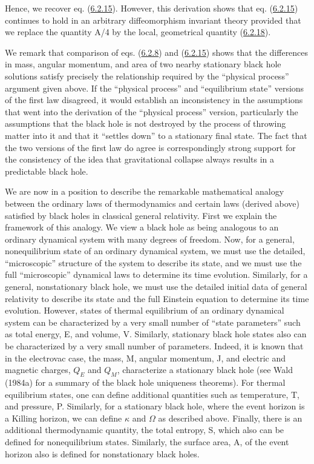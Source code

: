 \documentclass[11pt,a4paper]{article}
\begin{document}
\hypertarget{source-160}{}

Hence, we recover eq. (\hyperref[eq:6.2.15]{6.2.15}). However, this derivation shows that eq. (\hyperref[eq:6.2.15]{6.2.15}) continues to hold in an arbitrary diffeomorphism invariant theory provided that we replace the quantity A/4 by the local, geometrical quantity (\hyperref[eq:6.2.18]{6.2.18}).

We remark that comparison of eqs. (\hyperref[eq:6.2.8]{6.2.8}) and (\hyperref[eq:6.2.15]{6.2.15}) shows that the differences in mass, angular momentum, and area of two nearby stationary black hole solutions satisfy precisely the relationship required by the ``physical process'' argument given above. If the ``physical process'' and ``equilibrium state'' versions of the first law disagreed, it would establish an inconsistency in the assumptions that went into the derivation of the ``physical process'' version, particularly the assumptions that the black hole is not destroyed by the process of throwing matter into it and that it ``settles down'' to a stationary final state. The fact that the two versions of the first law do agree is correspondingly strong support for the consistency of the idea that gravitational collapse always results in a predictable black hole.

We are now in a position to describe the remarkable mathematical analogy between the ordinary laws of thermodynamics and certain laws (derived above) satisfied by black holes in classical general relativity. First we explain the framework of this analogy. We view a black hole as being analogous to an ordinary dynamical system with many degrees of freedom. Now, for a general, nonequilibrium state of an ordinary dynamical system, we must use the detailed, ``microscopic'' structure of the system to describe its state, and we must use the full ``microscopic'' dynamical laws to determine its time evolution. Similarly, for a general, nonstationary black hole, we must use the detailed initial data of general relativity to describe its state and the full Einstein equation to determine its time evolution. However, states of thermal equilibrium of an ordinary dynamical system can be characterized by a very small number of ``state parameters'' such as total energy, E, and volume, V. Similarly, stationary black hole states also can be characterized by a very small number of parameters. Indeed, it is known that in the electrovac case, the mass, M, angular momentum, J, and electric and magnetic charges, \(Q_E\) and \(Q_M\), characterize a stationary black hole (see Wald (1984a) for a summary of the black hole uniqueness theorems). For thermal equilibrium states, one can define additional quantities such as temperature, T, and pressure, P. Similarly, for a stationary black hole, where the event horizon is a Killing horizon, we\hypertarget{source-161}{} can define \(\kappa\) and \(\Omega\) as described above. Finally, there is an additional thermodynamic quantity, the total entropy, S, which also can be defined for nonequilibrium states. Similarly, the surface area, A, of the event horizon also is defined for nonstationary black holes.
\end{document}
